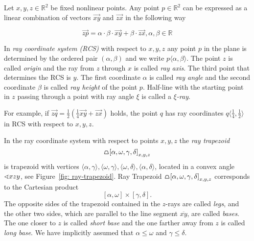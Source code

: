 \begin{definition}
Let $x, y, z \in \mathbb{R}^{2}$ be fixed nonlinear points. Any point $p \in \mathbb{R}^{2}$ can be expressed as a linear combination of vectors $\vec{xy}$ and $\vec{zx}$ in the following way

\begin{equation*}
 \label{lin}
 \vec{zp} = \alpha \cdot \beta \cdot \vec{xy} + \beta \cdot \vec{zx}, \alpha, \beta \in \mathbb{R}
\end{equation*}

In \textit{ray coordinate system (RCS)} with respect to $x,y,z$ any point $p$ in the plane is determined by the ordered pair $(\alpha, \beta)$ and we write $p \langle \alpha, \beta \rangle$. The point $z$ is called \textit{origin} and the ray from $z$ through $x$ is called \textit{ray axis}. The third point that determines the RCS is $y$. The first coordinate $\alpha$ is called \textit{ray angle} and the second coordinate $\beta$ is called \textit{ray height} of the point $p$. Half-line with the starting point in $z$ passing through a point with ray angle $\xi$ is called a \textit{$\xi$-ray}.
\label{Ray coordinate system}
\end{definition}

For example, if $\vec{zq} = \frac{1}{2}(\frac{1}{4}\vec{xy} + \vec{zx})$ holds, the point $q$ has ray coordinates $q\langle \frac{1}{4}, \frac{1}{2} \rangle$ in RCS with respect to $x,y,z$.

\begin{definition}
In the ray coordinate system with respect to points $x, y, z$ the \textit{ray trapezoid}
$$
\tpz{\left[ \alpha,\omega,\gamma,\delta \right]_{x,y,z} }
$$
is trapezoid with vertices $\langle\alpha, \gamma\rangle, \langle\omega, \gamma\rangle, \langle\omega, \delta\rangle, \langle\alpha, \delta\rangle$, located in a convex angle $\sphericalangle{xzy}$, see Figure~\ref{fig: ray-trapezoid}. Ray Trapezoid $\tpz{\left[ \alpha,\omega,\gamma,\delta \right]_{x,y,z} }$ corresponds to the Cartesian product
$$
\left[ \alpha,\omega \right] \times \left[ \gamma,\delta \right].
$$
The opposite sides of the trapezoid contained in the $z$-rays are called \textit{legs}, and the other two sides, which are parallel to the line segment $\overline{xy}$, are called \textit{bases}. The one closer to $z$ is called {\it short base} and the one farther away from $z$ is called {\it long base}. We have implicitly assumed that $\alpha \leq \omega$ and $\gamma \leq \delta$.
\end{definition}

